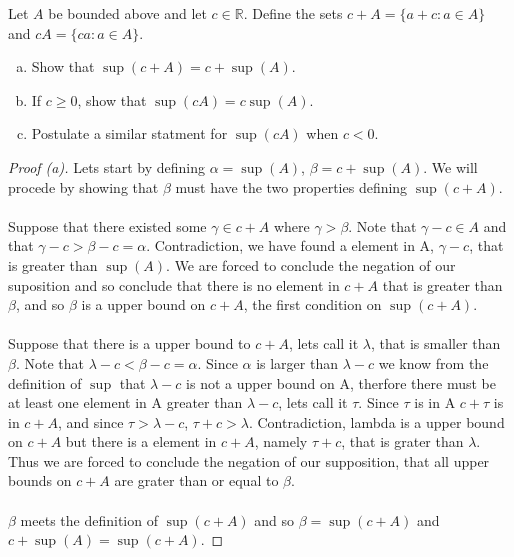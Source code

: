 \documentclass[12pt]{article}
\makeatletter
\theoremstyle{homework}
\newenvironment{exercise}[1]
{\def\@currentlabel{#1}\exercisecore}
{\endexercisecore}
\newcommand{\Reals}{\ensuremath{\mathbb R}}
\makeatother
\begin{document}
\begin{exercise}{1.3.5}  Let $A$ be bounded above and let $c\in\Reals$.
Define the sets $c+A = \{a+c:a\in A\}$ and $cA = \{ca:a\in A\}$.
\begin{enumerate}[(a)]
\item Show that $\sup(c+A) = c + \sup(A)$.
\item If $c\ge 0$, show that $\sup(cA) = c\sup(A)$.
\item Postulate a similar statment for $\sup(cA)$ when $c<0$.
\end{enumerate}
\end{exercise}
\begin{proof}[Proof (a)]
Lets start by defining $\alpha=\sup(A)$, $\beta=c + \sup(A)$.  We will procede by showing that $\beta$ must have the two properties defining $\sup(c+A)$.\\\\
Suppose that there existed some $\gamma\in c+A$ where $\gamma>\beta$.  Note that $\gamma-c\in A$ and that $\gamma-c>\beta-c=\alpha$.  Contradiction, we have found a element in A, $\gamma-c$, that is greater than $\sup(A)$.  We are forced to conclude the negation of our suposition and so conclude that there is no element in $c+A$ that is greater than $\beta$, and so $\beta$ is a upper bound on $c+A$, the first condition on $\sup(c+A)$.\\\\
Suppose that there is a upper bound to $c+A$, lets call it $\lambda$, that is smaller than $\beta$.  Note that $\lambda-c<\beta-c=\alpha$.  Since $\alpha$ is larger than $\lambda-c$ we know from the definition of $\sup$ that $\lambda-c$ is not a upper bound on A, therfore there must be at least one element in A greater than $\lambda-c$, lets call it $\tau$.  Since $\tau$ is in A $c+\tau$ is in $c+A$, and since $\tau>\lambda-c$, $\tau+c>\lambda$.  Contradiction, lambda is a upper bound on $c+A$ but there is a element in $c+A$, namely $\tau+c$, that is grater than $\lambda$.  Thus we are forced to conclude the negation of our supposition, that all upper bounds on $c+A$ are grater than or equal to $\beta$.\\\\
$\beta$ meets the definition of $\sup(c+A)$ and so $\beta=\sup(c+A)$ and $c + \sup(A)=\sup(c+A)$.
\end{proof}
\end{document}
